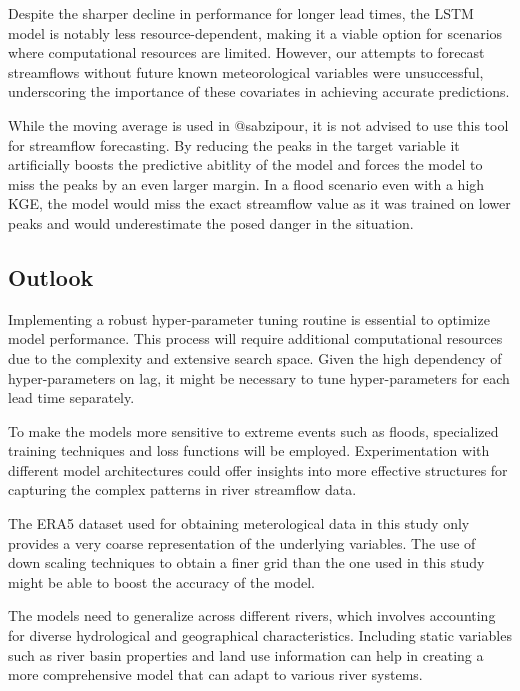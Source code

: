 \documentclass[
]{article}
\begin{document}
Despite the sharper decline in performance for longer lead times, the
LSTM model is notably less resource-dependent, making it a viable option
for scenarios where computational resources are limited. However, our
attempts to forecast streamflows without future known meteorological
variables were unsuccessful, underscoring the importance of these
covariates in achieving accurate predictions.

While the moving average is used in @sabzipour, it is not advised to use
this tool for streamflow forecasting. By reducing the peaks in the
target variable it artificially boosts the predictive abitlity of the
model and forces the model to miss the peaks by an even larger margin.
In a flood scenario even with a high KGE, the model would miss the exact
streamflow value as it was trained on lower peaks and would
underestimate the posed danger in the situation.

\hypertarget{outlook}{%
\subsection{Outlook}\label{outlook}}

Implementing a robust hyper-parameter tuning routine is essential to
optimize model performance. This process will require additional
computational resources due to the complexity and extensive search
space. Given the high dependency of hyper-parameters on lag, it might be
necessary to tune hyper-parameters for each lead time separately.

To make the models more sensitive to extreme events such as floods,
specialized training techniques and loss functions will be employed.
Experimentation with different model architectures could offer insights
into more effective structures for capturing the complex patterns in
river streamflow data.

The ERA5 dataset used for obtaining meterological data in this study
only provides a very coarse representation of the underlying variables.
The use of down scaling techniques to obtain a finer grid than the one
used in this study might be able to boost the accuracy of the model.

The models need to generalize across different rivers, which involves
accounting for diverse hydrological and geographical characteristics.
Including static variables such as river basin properties and land use
information can help in creating a more comprehensive model that can
adapt to various river systems.
\end{document}
